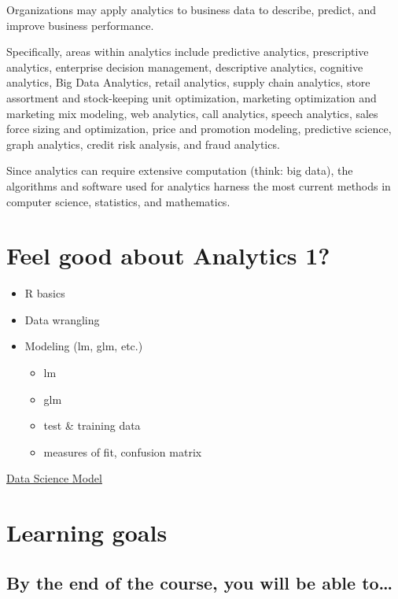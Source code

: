 \documentclass[
]{book}
\providecommand{\tightlist}{%
  \setlength{\itemsep}{0pt}\setlength{\parskip}{0pt}}
\theoremstyle{definition}
\theoremstyle{definition}
\theoremstyle{definition}
\theoremstyle{definition}
\theoremstyle{remark}
\begin{document}
Organizations may apply analytics to business data to describe, predict, and improve business performance.

Specifically, areas within analytics include predictive analytics, prescriptive analytics, enterprise decision management, descriptive analytics, cognitive analytics, Big Data Analytics, retail analytics, supply chain analytics, store assortment and stock-keeping unit optimization, marketing optimization and marketing mix modeling, web analytics, call analytics, speech analytics, sales force sizing and optimization, price and promotion modeling, predictive science, graph analytics, credit risk analysis, and fraud analytics.

Since analytics can require extensive computation (think: big data), the algorithms and software used for analytics harness the most current methods in computer science, statistics, and mathematics.

\hypertarget{feel-good-about-analytics-1}{%
\section{Feel good about Analytics 1?}\label{feel-good-about-analytics-1}}

\begin{itemize}
\tightlist
\item
  R basics
\item
  Data wrangling
\item
  Modeling (lm, glm, etc.)

  \begin{itemize}
  \tightlist
  \item
    lm
  \item
    glm
  \item
    test \& training data
  \item
    measures of fit, confusion matrix
  \end{itemize}
\end{itemize}

\href{https://d33wubrfki0l68.cloudfront.net/571b056757d68e6df81a3e3853f54d3c76ad6efc/32d37/diagrams/data-science.png}{Data Science Model}

\hypertarget{learning-goals}{%
\section{Learning goals}\label{learning-goals}}

\hypertarget{by-the-end-of-the-course-you-will-be-able-to}{%
\subsection{By the end of the course, you will be able to\ldots{}}\label{by-the-end-of-the-course-you-will-be-able-to}}
\end{document}
